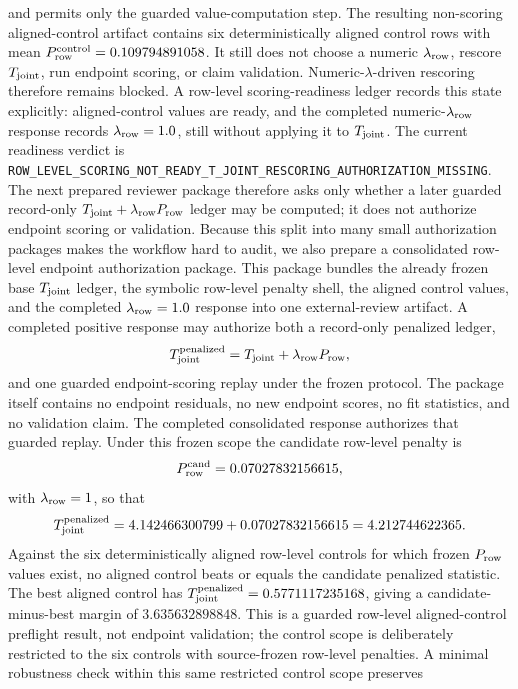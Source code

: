 and permits only the guarded value-computation step.  The resulting
non-scoring aligned-control artifact contains six deterministically aligned
control rows with mean \(P_{\rm row}^{\rm control}=0.109794891058\).  It still
does not choose a numeric \(\lambda_{\rm row}\), rescore \(T_{\rm joint}\), run
endpoint scoring, or claim validation.  Numeric-\(\lambda\)-driven rescoring
therefore remains blocked.
A row-level scoring-readiness ledger records this state explicitly:
aligned-control values are ready, and the completed numeric-\(\lambda_{\rm row}\)
response records \(\lambda_{\rm row}=1.0\), still without applying it to
\(T_{\rm joint}\).  The current readiness verdict is
\texttt{ROW\_LEVEL\_SCORING\_NOT\_READY\_T\_JOINT\_RESCORING\_AUTHORIZATION\_MISSING}.
The next prepared reviewer package therefore asks only
whether a later guarded record-only \(T_{\rm joint}+\lambda_{\rm row}P_{\rm row}\)
ledger may be computed; it does not authorize endpoint scoring or validation.
Because this split into many small authorization packages makes the workflow
hard to audit, we also prepare a consolidated row-level endpoint authorization
package.  This package bundles the already frozen base \(T_{\rm joint}\)
ledger, the symbolic row-level penalty shell, the aligned control values, and
the completed \(\lambda_{\rm row}=1.0\) response into one external-review
artifact.  A completed positive response may authorize both a record-only
penalized ledger,
\[
T_{\rm joint}^{\rm penalized}
  =
T_{\rm joint}+\lambda_{\rm row}P_{\rm row},
\]
and one guarded endpoint-scoring replay under the frozen protocol.  The package
itself contains no endpoint residuals, no new endpoint scores, no fit
statistics, and no validation claim.
The completed consolidated response authorizes that guarded replay.  Under this
frozen scope the candidate row-level penalty is
\[
P_{\rm row}^{\rm cand}=0.07027832156615,
\]
with \(\lambda_{\rm row}=1\), so that
\[
T_{\rm joint}^{\rm penalized}
  =
  4.142466300799+0.07027832156615
  =
  4.212744622365.
\]
Against the six deterministically aligned row-level controls for which frozen
\(P_{\rm row}\) values exist, no aligned control beats or equals the candidate
penalized statistic.  The best aligned control has
\(T_{\rm joint}^{\rm penalized}=0.5771117235168\), giving a candidate-minus-best
margin of \(3.635632898848\).  This is a guarded row-level aligned-control
preflight result, not endpoint validation; the control scope is deliberately
restricted to the six controls with source-frozen row-level penalties.
A minimal robustness check within this same restricted control scope preserves
